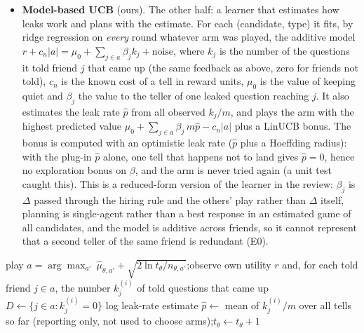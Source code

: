 \documentclass[10pt]{article}
\theoremstyle{plain}
\theoremstyle{definition}\newtheorem{definition}{Definition}
\begin{document}
\begin{itemize}
which is \EtwoBiasOverGap\% of the smallest payoff gap the learners must detect (\EtwoBiasGap{} points), and a control with no second teller scatters as much (up to \EtwoBiasControlMax{}); so we cannot show it is zero, only that it is small next to the signal, and agreement is $100\%$ in E2.
\item \textbf{Model-based UCB} (ours). The other half: a learner that estimates how leaks work and plans with the estimate. For each (candidate, type) it fits, by ridge regression on \emph{every} round
whatever arm was played, the additive model $r+c_n|a|=\mu_0+\sum_{j\in a}\beta_j k_j+\text{noise}$, where $k_j$ is the number of the questions it told friend $j$ that came up (the same feedback as above, zero for friends not told),
$c_n$ is the known cost of a tell in reward units, $\mu_0$ is the value of keeping quiet and $\beta_j$ the value to the teller of one leaked question reaching $j$. It also estimates the leak rate $\hat p$ from all observed $k_j/m$,
and plays the arm with the highest predicted value $\mu_0+\sum_{j\in a}\beta_j\,m\hat p-c_n|a|$ plus a LinUCB bonus. The bonus is computed with an optimistic leak rate ($\hat p$ plus a Hoeffding radius): with the plug-in $\hat p$ alone, one
tell that happens not to land gives $\hat p=0$, hence no exploration bonus on $\beta$, and the arm is never tried again (a unit test caught this). This is a reduced-form version of the learner in the review: $\beta_j$ is $\Delta$ passed through the hiring rule
and the others' play rather than $\Delta$ itself, planning is single-agent rather than a best response in an estimated game of all candidates, and the model is additive across friends, so it cannot represent that a second teller of the same friend is redundant (E0).
\end{itemize}

\begin{algorithm}[t]
\caption{One round of Leak-aware UCB for candidate $i$ of type $\theta$ (arms $a\subseteq L(i)$)}\label{alg:mb}
play $a=\arg\max_{a'}\ \hat\mu_{\theta,a'}+\sqrt{2\ln t_\theta/n_{\theta,a'}}$;\quad observe own utility $r$ and, for each told friend $j\in a$, the number $k^{(i)}_j$ of told questions that came up\;
$D\leftarrow\{j\in a: k^{(i)}_j=0\}$ 
log leak-rate estimate $\hat p\leftarrow$ mean of $k^{(i)}_j/m$ over all tells so far (reporting only, not used to choose arms);\quad $t_\theta\leftarrow t_\theta+1$\;
\end{algorithm}
\end{document}
